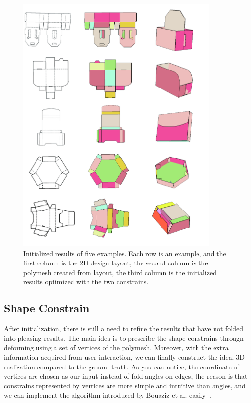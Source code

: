 \documentclass[submission]{gmp2018}
\begin{document}
\begin{figure}
	\centering
	\includegraphics[width=0.9\textwidth]{images/initial.jpg}
	\caption{Initialized results of five examples. Each row is an example, and the first column is the 2D design layout, the second column is the polymesh created from layout, the third column is the initialized results optimized with the two constrains.}
	\label{fig:initial}
\end{figure}


\subsection{Shape Constrain}
After initialization, there is still a need to refine the results that have not folded into pleasing results. The main idea is to prescribe the shape constrains througn deforming using a set of vertices of the polymesh. Moreover, with the extra information acquired from user interaction, we can finally construct the ideal 3D realization compared to the ground truth. As you can notice, the coordinate of vertices are chosen as our input instead of fold angles on edges, the reason is that constrains represented by vertices are more simple and intuitive than angles, and we can implement the algorithm introduced by Bouaziz et al. easily~\cite{Bouaziz:2012:SSD:2346796.2346802}.
\end{document}
